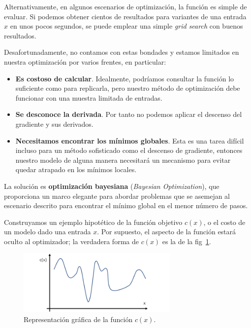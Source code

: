 \documentclass[a4paper,12pt]{article}
\begin{document}
Alternativamente, en algunos escenarios de optimización, la función es simple de evaluar. Si podemos obtener cientos de resultados para variantes de una entrada $x$ en unos pocos segundos, se puede emplear una simple \textit{grid search} con buenos resultados.

Desafortunadamente, no contamos con estas bondades y estamos limitados en nuestra optimización por varios frentes, en particular:
\begin{itemize}
	\item \textbf{Es costoso de calcular}. Idealmente, podríamos consultar la función lo suficiente como para replicarla, pero nuestro método de optimización debe funcionar con una muestra limitada de entradas.
	\item \textbf{Se desconoce la derivada}. Por tanto no podemos aplicar el descenso del gradiente y sus derivados.
	\item \textbf{Necesitamos encontrar los mínimos globales}. Esta es una tarea difícil incluso para un método sofisticado como el descenso de gradiente, entonces nuestro modelo de alguna manera necesitará un mecanismo para evitar quedar atrapado en los mínimos locales.
\end{itemize}

La solución es \textbf{optimización bayesiana} (\textit{Bayesian Optimization}), que proporciona un marco elegante para abordar problemas que se asemejan al escenario descrito para encontrar el mínimo global en el menor número de pasos.

Construyamos un ejemplo hipotético de la función objetivo $c(x)$, o el costo de un modelo dado una entrada $x$. Por supuesto, el aspecto de la función estará oculto al optimizador; la verdadera forma de $c(x)$ es la de la fig~\ref{fig:cx}.

\begin{figure}[H]
	\begin{center}
	\includegraphics[width=0.7\textwidth]{bayes_opt_1.png}
  	\caption{Representación gráfica de la función $c(x)$.}
  	\label{fig:cx}
  	\end{center}
\end{figure}
\end{document}
